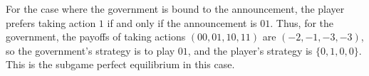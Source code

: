 \documentclass[10pt,letter]{article}
\begin{document}
For the case where the government is bound to the announcement, the player prefers taking action $1$ if and only if the announcement is $01$. Thus, for the government, the payoffs of taking actions $(00, 01, 10, 11)$ are $(-2, -1, -3, -3)$, so the government's strategy is to play $01$, and the player's strategy is $\{ 0, 1, 0, 0 \}$. This is the subgame perfect equilibrium in this case.
\end{document}

